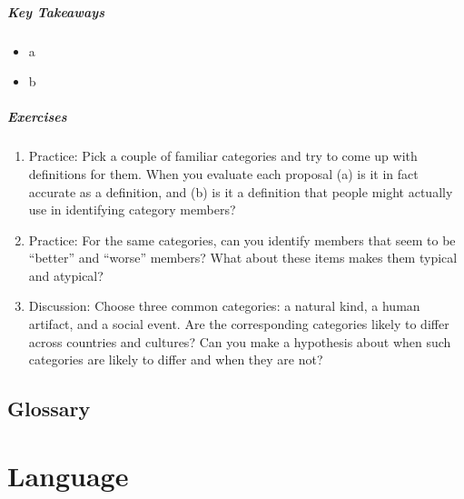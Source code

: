 \documentclass[
]{krantz}
\providecommand{\tightlist}{%
  \setlength{\itemsep}{0pt}\setlength{\parskip}{0pt}}
\begin{document}
\hypertarget{key-takeaways-6}{%
\paragraph*{Key Takeaways}\label{key-takeaways-6}}

\begin{itemize}
\tightlist
\item
  a
\item
  b
\end{itemize}

\hypertarget{exercises-6}{%
\paragraph*{Exercises}\label{exercises-6}}

\begin{enumerate}
\def\labelenumi{\arabic{enumi}.}
\tightlist
\item
  Practice: Pick a couple of familiar categories and try to come up with definitions for them. When you evaluate each proposal (a) is it in fact accurate as a definition, and (b) is it a definition that people might actually use in identifying category members?
\item
  Practice: For the same categories, can you identify members that seem to be ``better'' and ``worse'' members? What about these items makes them typical and atypical?
\item
  Discussion: Choose three common categories: a natural kind, a human artifact, and a social event. Are the corresponding categories likely to differ across countries and cultures? Can you make a hypothesis about when such categories are likely to differ and when they are not?
\end{enumerate}

\hypertarget{glossary-6}{%
\section{Glossary}\label{glossary-6}}

\hypertarget{language}{%
\chapter{Language}\label{language}}
\end{document}
